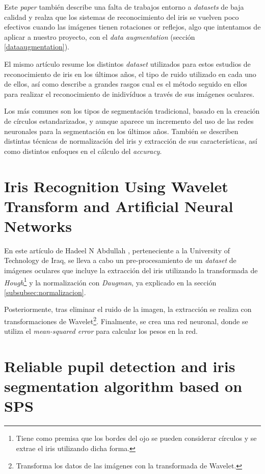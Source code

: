  Este \textit{paper} también describe una falta de trabajos entorno a \textit{datasets} de baja calidad y realza que los sistemas de reconocimiento del iris se vuelven 
 poco efectivos cuando las imágenes tienen rotaciones or reflejos, algo que intentamos de aplicar a nuestro proyecto, con el \textit{data augmentation} (sección \ref{dataaugmentation}).

 El mismo artículo resume los distintos \textit{dataset} utilizados para estos estudios de reconocimiento de iris en los últimos años, el tipo de ruido utilizado en cada uno de ellos,
 así como describe a grandes rasgos cual es el método seguido en ellos para realizar el reconocimiento de inidivíduos a través de sus imágenes oculares.
 
 Los más comunes son los tipos de segmentación tradicional, basado en la creación de círculos estandarizados, y aunque aparece un incremento del uso de las redes neuronales para la segmentación en los últimos años.
 También se describen distintas técnicas de normalización del iris y extracción de sus características, así como distintos enfoques en el cálculo del \textit{accuracy}.

\section{Iris Recognition Using Wavelet Transform and Artificial Neural Networks}

En este artículo de Hadeel N Abdullah \cite{abdullah_iris_2015}, perteneciente a la University of Technology de Iraq, se lleva a cabo un pre-procesamiento de un \textit{dataset} de imágenes oculares que incluye la extracción 
del iris utilizando la transformada de \textit{Hough}\footnote{Tiene como premisa que los bordes del ojo se pueden considerar círculos y se extrae el iris utilizando dicha forma.} y la normalización con \textit{Daugman}, ya explicado en la sección \ref{subsubsec:normalizacion}. 

Posteriormente, tras eliminar el ruido de la imagen, la extracción se realiza con transformaciones de Wavelet\footnote{Transforma los datos de las imágenes con la transformada de Wavelet.}. Finalmente, se crea una red neuronal, donde se utiliza el \textit{mean-squared error} para calcular los pesos en la red.

\section{Reliable pupil detection and iris segmentation algorithm based on SPS}

